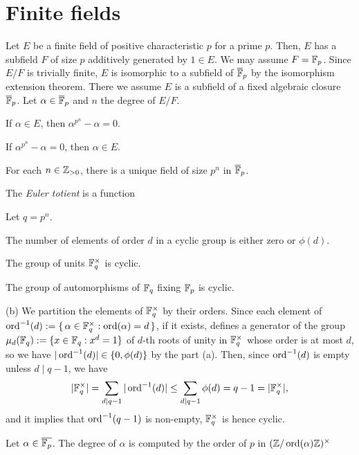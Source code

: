 \documentclass{../../large}
\begin{document}
\section{Finite fields}
\begin{prb}
Let $E$ be a finite field of positive characteristic $p$ for a prime $p$.
Then, $E$ has a subfield $F$ of size $p$ additively generated by $1\in E$.
We may assume $F=\mathbb{F}_p$.
Since $E/F$ is trivially finite, $E$ is isomorphic to a subfield of $\overline{\mathbb{F}}_p$ by the isomorphism extension theorem.
There we assume $E$ is a subfield of a fixed algebraic closure $\overline{\mathbb{F}}_p$.
Let $\alpha\in\overline{\mathbb{F}}_p$ and $n$ the degree of $E/F$.
\begin{parts}
\item If $\alpha\in E$, then $\alpha^{p^n}-\alpha=0$.
\item If $\alpha^{p^n}-\alpha=0$, then $\alpha\in E$.
\item For each $n\in\mathbb{Z}_{>0}$, there is a unique field of size $p^n$ in $\overline{\mathbb{F}}_p$.
\end{parts}
\end{prb}


\begin{prb}
The \emph{Euler totient} is a function

Let $q=p^n$.
\begin{parts}
\item The number of elements of order $d$ in a cyclic group is either zero or $\phi(d)$.
\item The group of units $\mathbb{F}_q^\times$ is cyclic.
\item The group of automorphisms of $\mathbb{F}_q$ fixing $\mathbb{F}_p$ is cyclic.
\end{parts}
\end{prb}
\begin{pf}
(b)
We partition the elements of $\mathbb{F}_q^\times$ by their orders.
Since each element of $\operatorname{ord}^{-1}(d):=\{\,\alpha\in\mathbb{F}_q^\times:\operatorname{ord}(\alpha)=d\,\}$, if it exists, defines a generator of the group $\mu_d(\mathbb{F}_q):=\{x\in\mathbb{F}_q:x^d=1\}$ of $d$-th roots of unity in $\mathbb{F}_q^\times$ whose order is at most $d$, so we have $|\operatorname{ord}^{-1}(d)|\in\{0,\phi(d)\}$ by the part (a).
Then, since $\operatorname{ord}^{-1}(d)$ is empty unless $d\mid q-1$, we have
\[|\mathbb{F}_q^\times|=\sum_{d\mid q-1}|\operatorname{ord}^{-1}(d)|\le\sum_{d\mid q-1}\phi(d)=q-1=|\mathbb{F}_q^\times|,\]
and it implies that $\operatorname{ord}^{-1}(q-1)$ is non-empty, $\mathbb{F}_q^\times$ is hence cyclic.
\end{pf}

\begin{prb}
Let $\alpha\in\overline{\mathbb{F}_p}$.
The degree of $\alpha$ is computed by the order of $p$ in $(\mathbb{Z}/\operatorname{ord}(\alpha)\mathbb{Z})^\times$
\end{prb}
\end{document}

